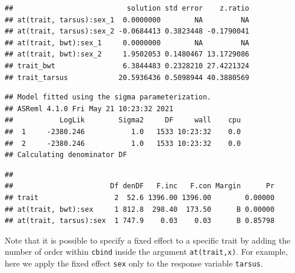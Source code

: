 \documentclass[
  12pt,
]{book}
\begin{document}
\begin{verbatim}
##                           solution std error    z.ratio
## at(trait, tarsus):sex_1  0.0000000        NA         NA
## at(trait, tarsus):sex_2 -0.0684413 0.3823448 -0.1790041
## at(trait, bwt):sex_1     0.0000000        NA         NA
## at(trait, bwt):sex_2     1.9502053 0.1480467 13.1729086
## trait_bwt                6.3844483 0.2328210 27.4221324
## trait_tarsus            20.5936436 0.5098944 40.3880569
\end{verbatim}

\begin{verbatim}
## Model fitted using the sigma parameterization.
## ASReml 4.1.0 Fri May 21 10:23:32 2021
##           LogLik        Sigma2     DF     wall    cpu
##  1     -2380.246           1.0   1533 10:23:32    0.0
##  2     -2380.246           1.0   1533 10:23:32    0.0
## Calculating denominator DF
\end{verbatim}

\begin{verbatim}
## 
##                       Df denDF   F.inc   F.con Margin      Pr
## trait                  2  52.6 1396.00 1396.00        0.00000
## at(trait, bwt):sex     1 812.8  298.40  173.50      B 0.00000
## at(trait, tarsus):sex  1 747.9    0.03    0.03      B 0.85798
\end{verbatim}

Note that it is possible to specify a fixed effect to a specific trait by adding the number of order within \texttt{cbind} inside the argument \texttt{at(trait,x)}. For example, here we apply the fixed effect \texttt{sex} only to the response variable \texttt{tarsus}.
\end{document}
